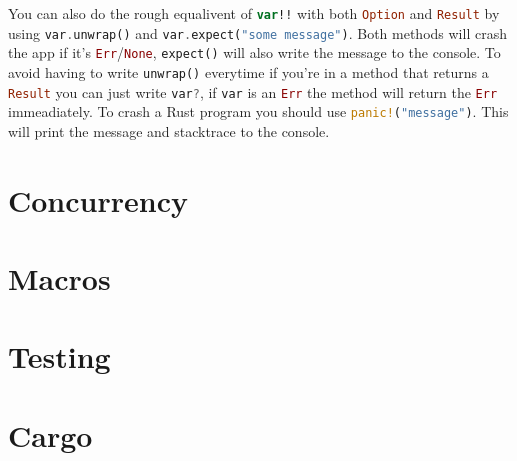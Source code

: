 \documentclass[a4paper,11pt]{article}
\begin{document}
You can also do the rough equalivent of  \lstinline[language=Kotlin]{var!!} with both \lstinline[language=Rust]{Option} and \lstinline[language=Rust]{Result} by using \lstinline[language=Rust]{var.unwrap()} and \lstinline[language=Rust]{var.expect("some message")}. Both methods will crash the app if it's \lstinline[language=Rust]{Err}/\lstinline[language=Rust]{None}, \lstinline[language=Rust]{expect()} will also write the message to the console.
\newline
To avoid having to write \lstinline[language=Rust]{unwrap()} everytime if you're in a method that returns a \lstinline[language=Rust]{Result} you can just write \lstinline[language=Rust]{var?}, if \lstinline{var} is an \lstinline[language=Rust]{Err} the method will return the \lstinline[language=Rust]{Err} immeadiately.
\newline
To crash a Rust program you should use \lstinline[language=Rust]{panic!("message")}. This will print the message and stacktrace to the console.

\newpage
\section{Concurrency}

\newpage
\section{Macros}

\newpage
\section{Testing}

\newpage
\section{Cargo}
\end{document}
